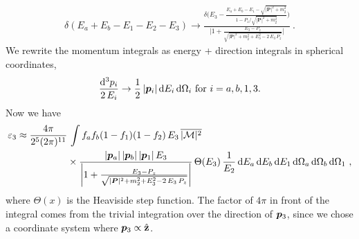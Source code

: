 \begin{align}
    \delta(E_a + E_b - E_1 - E_2 - E_3) 
    \rightarrow 
    \frac{\delta\bigg(
        E_3 -     
        \frac{E_a + E_b - E_1 - \sqrt{|\bm{P}|^2 + m_2^2}}{1 - P_z / \sqrt{|\bm{P}|^2 + m_2^2}}
    \bigg)}
    {
    \bigg|
        1 + \frac{E_3 - P_z}{\sqrt{|\bm{P}|^2 + m_2^2 + E_3^2 - 2 \, E_3 \, P_z}}
    \bigg|
    } \ .
\end{align}
We rewrite the momentum integrals as energy + direction integrals in spherical coordinates, 
\begin{align}
    \frac{\dd^3 p_i}{2 \, E_i} \rightarrow
    \frac{1}{2} \, \pmag[i] \, \dd E_i \, \dd \Omega_i \ \text{for } i = a, b, 1, 3. 
\end{align}
Now we have
\begin{equation}
    \begin{aligned}
        \label{eq:dumb-approximate-integral}
        \varepsilon_3 \approx 
        \frac{4 \pi}{2^5 (2\pi)^{11}} &
        \, \int 
        f_a f_b (1 - f_1) (1 - f_2)
        \, E_3
        \, \overline{|\mathcal{M}|^2} \\
        & \times
        \frac{
            \pmag[a] 
            \, \pmag[b]
            \, \pmag[1]
            \, E_3
            }{
                \bigg|
                1 + \frac{E_3 - P_z}{\sqrt{|\bm{P}|^2 + m_2^2 + E_3^2 - 2 \, E_3 \, P_z}}
                \bigg|
            }
        \, \Theta(E_3)
        \, \frac{1}{E_2}
        \, \dd E_a 
        \, \dd E_b
        \, \dd E_1
        \, \dd \Omega_a
        \, \dd \Omega_b
        \, \dd \Omega_1
        \ ,
    \end{aligned}
\end{equation}
where $\Theta(x)$ is the Heaviside step function. The factor of $4\pi$ in front of the integral comes from the trivial integration over the direction of $\pvec[3]$, since we chose a coordinate system where $\pvec[3] \propto \hat{\mathbf{z}}$.